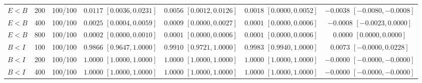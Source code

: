 \documentclass[12pt,letterpaper]{article}
\theoremstyle{plain}
\theoremstyle{definition}
\begin{document}
\begin{table}[p]
\begin{adjustbox}{max width=\linewidth}
\begin{tabular}{lrccccc}
$E<B$ & 200 & 100/100 & \shortstack{$0.0117$\\{\scriptsize$[0.0036,0.0231]$}} & \shortstack{$0.0056$\\{\scriptsize$[0.0012,0.0126]$}} & \shortstack{$0.0018$\\{\scriptsize$[0.0000,0.0052]$}} & \shortstack{$-0.0038$\\{\scriptsize$[-0.0080,-0.0008]$}}\\
$E<B$ & 400 & 100/100 & \shortstack{$0.0025$\\{\scriptsize$[0.0004,0.0059]$}} & \shortstack{$0.0009$\\{\scriptsize$[0.0000,0.0027]$}} & \shortstack{$0.0001$\\{\scriptsize$[0.0000,0.0006]$}} & \shortstack{$-0.0008$\\{\scriptsize$[-0.0023,0.0000]$}}\\
$E<B$ & 800 & 100/100 & \shortstack{$0.0002$\\{\scriptsize$[0.0000,0.0010]$}} & \shortstack{$0.0001$\\{\scriptsize$[0.0000,0.0006]$}} & \shortstack{$0.0001$\\{\scriptsize$[0.0000,0.0006]$}} & \shortstack{$0.0000$\\{\scriptsize$[0.0000,0.0000]$}}\\
\addlinespace
$B<I$ & 100 & 100/100 & \shortstack{$0.9866$\\{\scriptsize$[0.9647,1.0000]$}} & \shortstack{$0.9910$\\{\scriptsize$[0.9721,1.0000]$}} & \shortstack{$0.9983$\\{\scriptsize$[0.9940,1.0000]$}} & \shortstack{$0.0073$\\{\scriptsize$[-0.0000,0.0228]$}}\\
$B<I$ & 200 & 100/100 & \shortstack{$1.0000$\\{\scriptsize$[1.0000,1.0000]$}} & \shortstack{$1.0000$\\{\scriptsize$[1.0000,1.0000]$}} & \shortstack{$1.0000$\\{\scriptsize$[1.0000,1.0000]$}} & \shortstack{$-0.0000$\\{\scriptsize$[-0.0000,-0.0000]$}}\\
$B<I$ & 400 & 100/100 & \shortstack{$1.0000$\\{\scriptsize$[1.0000,1.0000]$}} & \shortstack{$1.0000$\\{\scriptsize$[1.0000,1.0000]$}} & \shortstack{$1.0000$\\{\scriptsize$[1.0000,1.0000]$}} & \shortstack{$-0.0000$\\{\scriptsize$[-0.0000,-0.0000]$}}\\

\end{tabular}
\end{adjustbox}
\end{table}
\end{document}
